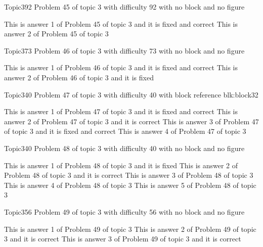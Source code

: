 \documentclass[master]{exam}
\begin{document}
\begin{problem}{Topic3}{92}
	Problem 45 of topic 3 with difficulty 92 with no block and no figure
	\begin{answers}
		 This is answer 1 of Problem 45 of topic 3 and it is fixed and correct
		\answer This is answer 2 of Problem 45 of topic 3 
	\end{answers}
\end{problem}

\begin{problem}{Topic3}{73}
	Problem 46 of topic 3 with difficulty 73 with no block and no figure
	\begin{answers}
		 This is answer 1 of Problem 46 of topic 3 and it is fixed and correct
		\answer[fixed] This is answer 2 of Problem 46 of topic 3 and it is fixed
	\end{answers}
\end{problem}

\begin{problem}[requires=blk:block32]{Topic3}{40}
	Problem 47 of topic 3 with difficulty 40 with block reference blk:block32
	\begin{answers}
		 This is answer 1 of Problem 47 of topic 3 and it is fixed and correct
		\answer[correct] This is answer 2 of Problem 47 of topic 3 and it is correct
		 This is answer 3 of Problem 47 of topic 3 and it is fixed and correct
		\answer This is answer 4 of Problem 47 of topic 3 
	\end{answers}
\end{problem}

\begin{problem}{Topic3}{40}
	Problem 48 of topic 3 with difficulty 40 with no block and no figure
	\begin{answers}
		\answer[fixed] This is answer 1 of Problem 48 of topic 3 and it is fixed
		\answer[correct] This is answer 2 of Problem 48 of topic 3 and it is correct
		\answer This is answer 3 of Problem 48 of topic 3 
		\answer This is answer 4 of Problem 48 of topic 3 
		\answer This is answer 5 of Problem 48 of topic 3 
	\end{answers}
\end{problem}

\begin{problem}{Topic3}{56}
	Problem 49 of topic 3 with difficulty 56 with no block and no figure
	\begin{answers}
		\answer This is answer 1 of Problem 49 of topic 3 
		\answer[correct] This is answer 2 of Problem 49 of topic 3 and it is correct
		\answer[correct] This is answer 3 of Problem 49 of topic 3 and it is correct
	\end{answers}
\end{problem}
\end{document}
